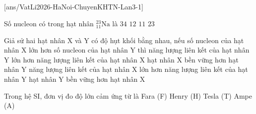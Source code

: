 \def\CheDo{solcolor}%
\def\tenchuong{THPT chuyên KHTN, Hà Nội -- Lần 3}
\def\thuonghieu{VẬT LÍ 12 -- Eduzy.com.vn}
\def\TachCauDS{1}
\def\TachCauLG{1}




	\noindent
	\subsection*{}
	\setcounter{ex}{0}
	[ans/VatLi2026-HaNoi-ChuyenKHTN-Lan3-1]

	\begin{ex}%
		Số nucleon có trong hạt nhân ${}^{23}_{11}\text{Na}$ là
		\choice
		{$34$}
		{$12$}
		{$11$}
		{\True $23$}
	\end{ex}

	\begin{ex}%
		Giả sử hai hạt nhân X và Y có độ hụt khối bằng nhau, nếu số nucleon của hạt nhân X lớn hơn số nucleon của hạt nhân Y thì
		\choice
		{năng lượng liên kết của hạt nhân Y lớn hơn năng lượng liên kết của hạt nhân X}
		{hạt nhân X bền vững hơn hạt nhân Y}
		{năng lượng liên kết của hạt nhân X lớn hơn năng lượng liên kết của hạt nhân Y}
		{\True hạt nhân Y bền vững hơn hạt nhân X}
	\end{ex}

	\begin{ex}%
		Trong hệ SI, đơn vị đo độ lớn cảm ứng từ là
		\choice
		{Fara (F)}
		{Henry (H)}
		{\True Tesla (T)}
		{Ampe (A)}
	\end{ex}

